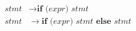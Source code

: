 
\begin{align}
\textit{stmt} &\rightarrow \textbf{if } \textbf{(}\textit{expr}\textbf{) } \textit{stmt} \\
\textit{stmt} &\rightarrow \textbf{if } \textbf{(}\textit{expr}\textbf{) } stmt \textbf{ else } \textit{stmt}
\end{align}
